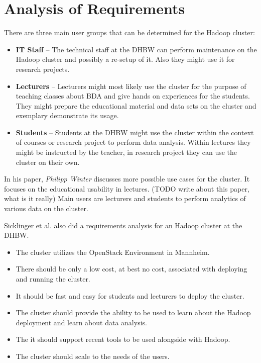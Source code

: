 \section{Analysis of Requirements}

There are three main user groups that can be determined for the Hadoop cluster:

\begin{itemize}
    \item \textbf{IT Staff} -- The technical staff at the \ac{DHBW} can perform maintenance on the Hadoop cluster and possibly a re-setup of it.
    Also they might use it for research projects.
    \item \textbf{Lecturers} -- Lecturers might most likely use the cluster for the purpose of teaching classes about \ac{BDA} and give hands on experiences for the students. They might prepare the educational material and data sets on the cluster and exemplary demonstrate its usage.
    \item \textbf{Students} -- Students at the \ac{DHBW} might use the cluster within the context of courses or research project to perform data analysis. Within lectures they might be instructed by the teacher, in research project they can use the cluster on their own.
\end{itemize}

In his paper, \emph{Philipp Winter} discusses more possible use cases for the cluster. It focuses on the educational usability in lectures.
(TODO write about this paper, what is it really)
Main users are lecturers and students to perform analytics of various data on the cluster.

Sicklinger et al. also did a requirements analysis for an Hadoop cluster at the \ac{DHBW}. 
\begin{itemize}
    \item The cluster utilizes the OpenStack Environment in Mannheim.
    \item There should be only a low cost, at best no cost, associated with deploying and running the cluster.
    \item It should be fast and easy for students and lecturers to deploy the cluster.
    \item The cluster should provide the ability to be used to learn about the Hadoop deployment and learn about data analysis.
    \item The it should support recent tools to be used alongside with Hadoop.
    \item The cluster should scale to the needs of the users.
\end{itemize}
\autocite[][p. 40ff]{wi2018managementsystems}


